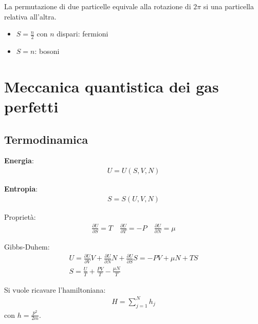 La permutazione di due particelle equivale alla rotazione di $2\pi$ si una particella relativa all'altra.

\begin{itemize}
\item $S=\frac{n}{2}$ con $n$ dispari: fermioni
\item $S=n$: bosoni
\end{itemize}

\section{Meccanica quantistica dei gas perfetti} %
\subsection{Termodinamica} %
\textbf{Energia}:
\begin{equation}\begin{split}
U=U\left(S,V,N\right)
\end{split}\end{equation}

\textbf{Entropia}:
\begin{equation}\begin{split}
S=S\left(U,V,N\right)
\end{split}\end{equation}

Proprietà:
\begin{equation}\begin{split}
\frac{\partial U}{\partial S}=T \quad \frac{\partial U}{\partial T}=-P \quad \frac{\partial U}{\partial N}=\mu
\end{split}\end{equation}

Gibbs-Duhem:
\begin{equation}\begin{split}
U=\frac{\partial U}{\partial V}V+\frac{\partial U}{\partial N}N+\frac{\partial U}{\partial S}S=-PV+\mu N+TS \\
S=\frac{U}{T}+\frac{PV}{T}-\frac{\mu N}{T}
\end{split}\end{equation}

Si vuole ricavare l'hamiltoniana:
\begin{equation}\begin{split}
H=\sum_{j=1}^{N}{h_j}
\end{split}\end{equation}
con $h=\frac{p^2}{2m}$.

